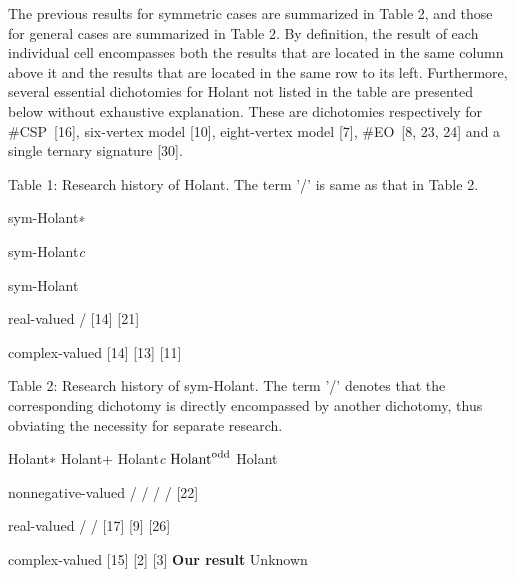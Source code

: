 The previous results for symmetric cases are summarized in Table 2, and those for general cases are summarized in Table 2.
By definition, the result of each individual cell encompasses both the results that are located in the same column above it and the results that are located in the same row to its left. Furthermore, several essential dichotomies for Holant not listed in the table are presented below without exhaustive explanation. These are dichotomies respectively for \#CSP [16], six-vertex model [10], eight-vertex model [7], \#EO [8, 23, 24] and a single ternary signature [30].\par




Table 1: Research history of Holant. The term ’/’ is same as that in Table 2.





 
sym-Holant∗
 
sym-Holant\emph{c}
 
sym-Holant
 
\par




real-valued 
/ 
[14] 
[21] 
\par


complex-valued 
[14] 
[13] 
[11] 
\par







Table 2: Research history of sym-Holant. The term ’/’ denotes that the corresponding dichotomy is directly encompassed by another dichotomy, thus obviating the necessity for separate research.





 
Holant∗ 
Holant+ 
Holant\emph{c} 
$\textup{{Holant}}^{\text{odd}}$ 
Holant 
\par


nonnegative-valued 
/ 
/ 
/ 
/ 
[22] 
\par


real-valued 
/ 
/ 
[17] 
[9] 
[26] 
\par


complex-valued 
[15] 
[2] 
[3] 
\textbf{Our result} 
Unknown 
\par









